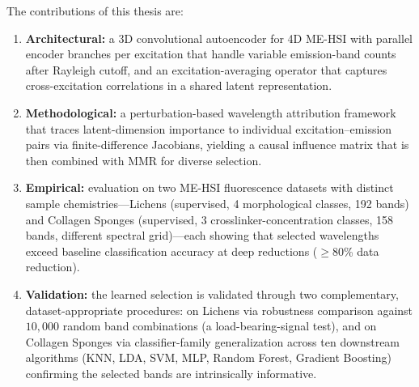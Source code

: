 The contributions of this thesis are:
\begin{enumerate}
    \item \textbf{Architectural:} a 3D convolutional autoencoder for 4D ME-HSI with parallel encoder branches per excitation that handle variable emission-band counts after Rayleigh cutoff, and an excitation-averaging operator that captures cross-excitation correlations in a shared latent representation.
    \item \textbf{Methodological:} a perturbation-based wavelength attribution framework that traces latent-dimension importance to individual excitation--emission pairs via finite-difference Jacobians, yielding a causal influence matrix that is then combined with MMR for diverse selection.
    \item \textbf{Empirical:} evaluation on two ME-HSI fluorescence datasets with distinct sample chemistries---Lichens (supervised, 4 morphological classes, 192 bands) and Collagen Sponges (supervised, 3 crosslinker-concentration classes, 158 bands, different spectral grid)---each showing that selected wavelengths exceed baseline classification accuracy at deep reductions ($\geq$80\% data reduction).
    \item \textbf{Validation:} the learned selection is validated through two complementary, dataset-appropriate procedures: on Lichens via robustness comparison against $10{,}000$ random band combinations (a load-bearing-signal test), and on Collagen Sponges via classifier-family generalization across ten downstream algorithms (KNN, LDA, SVM, MLP, Random Forest, Gradient Boosting) confirming the selected bands are intrinsically informative.
\end{enumerate}